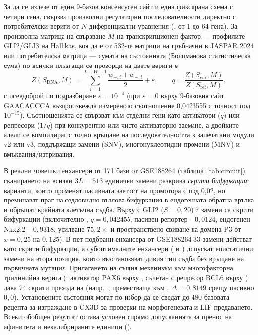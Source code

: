 \documentclass[10.5pt,a4paper]{article}
\begin{document}
За да се излезе от един 9-базов консенсусен сайт и една фиксирана схема с четири гена,  свързва произволни регулаторни последователности директно с потребителски вериги от $N$ диференциални уравнения (, от 1 до 64 гена). За произволна матрица на свързване $M$ на транскрипционен фактор — профилите GLI2/GLI3 на Hallikas, коя да е от 532-те матрици на гръбначни в JASPAR 2024 или потребителска матрица — сумата на състоянията (Болцманова статистическа сума) по всички плъзгащи се прозорци на двете вериги е
\[
Z(S_{\mathrm{DNA}}, M) = \sum_{i=1}^{L-W+1} \frac{w_{+,i} + w_{-,i}}{2} + \varepsilon,
\qquad
q = \frac{Z(S_{\mathrm{var}}, M)}{Z(S_{\mathrm{ref}}, M)},
\]
с псевдоброй по подразбиране $\varepsilon=10^{-4}$ (при $\varepsilon=0$ върху 9-базовия сайт GAACACCCA възпроизвежда измереното съотношение 0,0423555 с точност под $10^{-15}$). Съотношенията се свързват към отделни гени като активатори ($q$) или репресори ($1/q$) при конкурентно или чисто активаторно заемане, а двойките алели се компилират с точно връщане на последователността в запечатани модули  v2 или v3, поддържащи замени (SNV), многонуклеотидни промени (MNV) и вмъквания/изтривания.

В реални човешки енхансери от 171 бази от GSE188264 (таблица~\ref{tab:circuit}) сканирането на всички $3L=513$ единични замени разкрива \emph{скрити бифуркации}: варианти, които променят пасивната заетост на промотора с под 0,02, но преминават праг на седловидно-възлова бифуркация в ендогенната обратна връзка и обръщат крайната клетъчна съдба. Върху  с GLI2 ($S=0{,}20$) 7 замени са скрити бифуркации (включително , $q=0{,}042455$, пасивен репортер $-0{,}0124$, ендогенен Nkx2.2 $-0{,}9318$, усилване $75{,}2\times$ и пространствено свиване на домена P3 от $x=0{,}25$ на $0{,}125$). В пет подбрани енхансера от GSE188264 33 замени действат като скрити бифуркации, а субоптималните енхансери ( и ) допускат епистатични замени на втора позиция, които възстановяват дивия тип съдба без връщане на първичната мутация. Прилагането на същия механизъм към многофакторна трилинийна верига (: активатор  PAX6 върху , съчетан с репресор  BCL6 върху ) дава 74 скрити прехода на  (напр.\ , преместваща  към , $\Delta=0{,}8149$ срещу пасивно $0{,}0$). Установените състояния могат по избор да се сведат до 480-базовата рецепта за изграждане в CX3D за проверки на морфогенезата и LIF предаването. Всеки обобщен резултат остава условен спрямо допусканията за пренос на афинитета и некалибрираните единици ().
\end{document}
